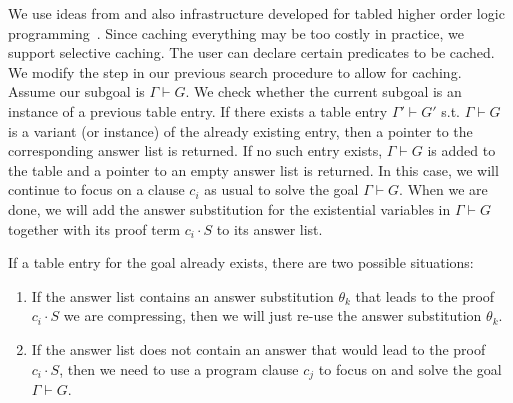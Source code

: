 \documentclass{llncs}
\newcommand{\vd}{\vdash}
\begin{document}
We use ideas from and also infrastructure developed for tabled higher
order logic programming~\cite{Pientka03phd,Pientka:ICLP02}.  Since
caching everything may be too costly in practice, we support selective
caching. The user can declare certain predicates to be cached. We
modify the {} step in our previous search procedure to
allow for caching.
Assume our subgoal is $\Gamma \vd G$. We check whether the
current subgoal is an instance of a previous table entry. If there
exists a table entry $\Gamma' \vd G'$ s.t. $\Gamma \vd G$ is a variant
(or instance) of the already existing entry, then a pointer to the
corresponding answer list is returned. If no such entry exists,
$\Gamma \vd G$ is added to the table and a pointer to an empty answer
list is returned. In this case, we will continue to focus on a clause
$c_i$ as usual to solve the goal $\Gamma \vd G$. When we are done, we
will add the answer substitution for the existential variables in
$\Gamma \vd G$ together with its proof term $c_i \cdot S$ to its
answer list.

If a table entry for the goal already exists, there are two possible
situations:
\begin{enumerate}
\item If the answer list contains an answer substitution $\theta_k$
that leads to the proof $c_i \cdot S$ we are compressing, then we will
just re-use the answer substitution $\theta_k$.
\item If the
answer list does not contain an answer that would lead to the proof
$c_i \cdot S$, then we need to use a program clause $c_j$ to focus on
and solve the goal $\Gamma \vd G$. 
\end{enumerate}
\end{document}
